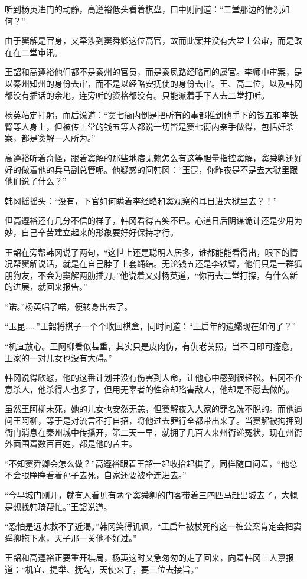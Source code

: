 听到杨英进门的动静，高遵裕低头看着棋盘，口中则问道：“二堂那边的情况如何？”

由于窦解是官身，又牵涉到窦舜卿这位高官，故而此案并没有大堂上公审，而是改在在二堂审讯。

王韶和高遵裕他们都不是秦州的官员，而是秦凤路经略司的属官。李师中审案，是以秦州知州的身份去审，而不是以经略安抚使的身份去审。王、高二位，以及韩冈都没有插话的余地，连旁听的资格都没有。只能派着手下人去二堂打听。

杨英站定打躬，而后说道：“窦七衙内倒是把所有的事都推到他手下的钱五和李铁臂等人身上，但被传上堂的钱五等人都说一切皆是窦七衙内亲手做得，包括奸杀案，都是窦解一人所为。”

高遵裕听着奇怪，跟着窦解的那些地痞无赖怎么有这等胆量指控窦解，窦舜卿还好好的做着他的兵马副总管呢。他疑惑的问韩冈：“玉昆，你昨夜是不是去大狱里跟他们说了什么？”

韩冈摇摇头：“没有，下官如何瞒着李经略和窦观察的耳目进大狱里去？！”

但高遵裕还有几分不信的样子，韩冈看得苦笑不已。心道日后阴谋诡计还是少用为妙，自己辛苦建立起来的形象要好好保持才行。

王韶在旁帮韩冈说了两句，“这世上还是聪明人居多，谁都能能看得出，眼下的情况帮窦解说话，就是在自己脖子上套绳结。无论钱五还是李铁臂，他们只是一群狐朋狗友，不会为窦解两肋插刀。”他说着又对杨英道，“你再去二堂打探，有什么新的进展，就回来报告。”

“诺。”杨英唱了喏，便转身出去了。

“玉昆……”王韶将棋子一个个收回棋盒，同时问道：“王启年的遗孀现在如何了？”

“机宜放心。王阿柳看似甚重，其实只是皮肉伤，有仇老关照，当不日即可痊愈，王家的一对儿女也没有大碍。”

韩冈说得欣慰，他的这番计划并没有伤害到人命，让他心中感到很轻松。韩冈不介意杀人，他杀得人也多了，但用无辜者的性命却陷害敌人，他却是不愿去做的。

虽然王阿柳未死，她的儿女也安然无恙，但窦解夜入人家的罪名洗不脱的。而他逼问王阿柳，等于是对流言不打自招，将他过去罪行全都带出来了。当窦解被拘押到衙门消息在秦州城中传播开，第二天一早，就拥了几百人来州衙递冤状，现在州衙外面围着数百百姓，都是他的苦主。

“不知窦舜卿会怎么做？”高遵裕跟着王韶一起收拾起棋子，同样随口问着，“他总不会眼睁睁看着孙子去死，自家还要被牵连进去。”

“今早城门刚开，就有人看见有两个窦舜卿的门客带着三四匹马赶出城去了，大概是想找韩琦帮忙。”王韶说道。

“恐怕是远水救不了近渴。”韩冈笑得讥讽，“王启年被杖死的这一桩公案肯定会把窦舜卿拖下水，天子那一关他不好过。”

王韶和高遵裕正要重开棋局，杨英这时又急匆匆的走了回来，向着韩冈三人禀报道：“机宜、提举、抚勾，天使来了，要三位去接旨。”

